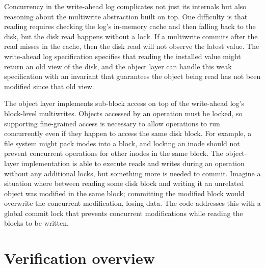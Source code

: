 Concurrency in the write-ahead log complicates not just its internals but also
reasoning about the multiwrite abstraction built on top. One difficulty is that
reading requires checking the log's in-memory cache and then falling back to the disk,
but the disk read happens without a lock. If a multiwrite commits after the read
misses in the cache, then the disk read will not observe the latest value. The
write-ahead log specification specifies that reading the installed value might return an
old view of the disk, and the object layer can handle this weak specification with
an invariant that guarantees the object being read has not been modified since
that old view.

The object layer implements sub-block access on top of the write-ahead
log's block-level multiwrites. Objects accessed by an operation must be locked,
so supporting fine-grained access is necessary to allow operations to run
concurrently even if they happen to access the same disk block. For example, a
file system might pack inodes into a block, and locking an inode should not
prevent concurrent operations for other inodes in the same block. The
object-layer implementation is able to execute reads and writes during an
operation without any additional locks, but something more is needed to commit.
Imagine a situation where between reading some disk block and writing it an
unrelated object was modified in the same block; committing the modified block
would overwrite the concurrent modification, losing data. The code addresses
this with a global commit lock that prevents concurrent modifications while
reading the blocks to be written.




\section{Verification overview}
\label{sec:overview}

